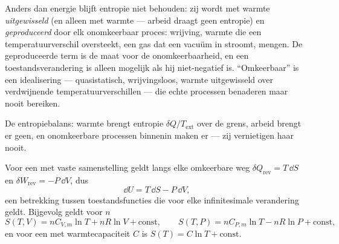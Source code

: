 \begin{remark}\label{rem:b1:second-law-entropy:reading}
Anders dan energie blijft entropie niet behouden: zij wordt met warmte
\emph{uitgewisseld} (en alleen met warmte --- arbeid draagt geen entropie) en
\emph{geproduceerd} door elk onomkeerbaar proces: wrijving, warmte die een
temperatuurverschil oversteekt, een gas dat een vacuüm in stroomt, mengen. De
geproduceerde term is de maat voor de onomkeerbaarheid, en een toestandsverandering
is alleen mogelijk als hij niet-negatief is. ``Omkeerbaar'' is een idealisering
--- quasistatisch, wrijvingsloos, warmte uitgewisseld over verdwijnende
temperatuurverschillen --- die echte processen benaderen maar nooit bereiken.
\end{remark}

\begin{omfigure}

{\small De entropiebalans: warmte brengt entropie $\delta Q/T_{\mathrm{ext}}$
over de grens, arbeid brengt er geen, en onomkeerbare processen binnenin
maken er --- zij vernietigen haar nooit.}
\end{omfigure}

\begin{proposition}\label{prop:b1:second-law-entropy:identity}
Voor een  met vaste samenstelling geldt langs elke omkeerbare weg
$\delta Q_{\mathrm{rev}} = T\,\dd S$ en $\delta W_{\mathrm{rev}} = -P\,\dd V$, dus
\[
\dd U = T\,\dd S - P\,\dd V ,
\]
een betrekking tussen toestandsfuncties die voor elke infinitesimale
verandering geldt. Bijgevolg geldt voor $n$  
\[
S(T, V) = nC_{V,m}\ln T + nR\ln V + \text{const}, \qquad
S(T, P) = nC_{P,m}\ln T - nR\ln P + \text{const},
\]
en voor een  met warmtecapaciteit $C$ is $S(T) = C\ln T + \text{const}$.
\end{proposition}

